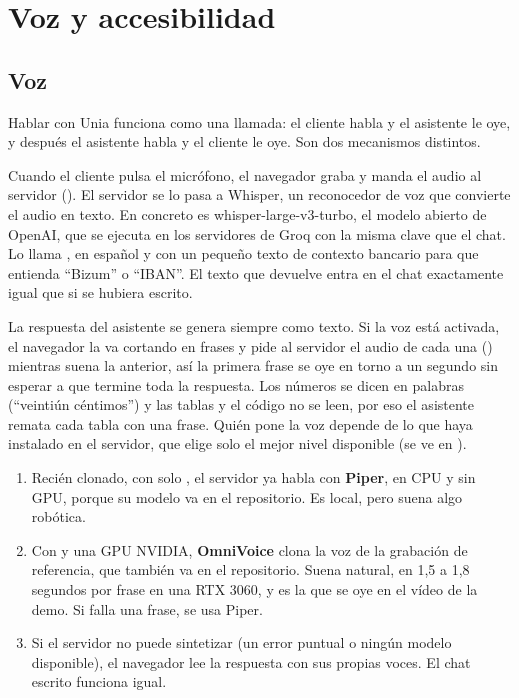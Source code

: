 \section{Voz y accesibilidad}\label{sec:voz}

\subsection{Voz}\label{sec:voz-detalle}

Hablar con Unia funciona como una llamada: el cliente habla y el asistente le oye, y después el asistente habla y el
cliente le oye. Son dos mecanismos distintos.

Cuando el cliente pulsa el micrófono, el navegador graba y manda el audio al servidor (). El servidor se lo
pasa a Whisper, un reconocedor de voz que convierte el audio en texto. En concreto es whisper-large-v3-turbo, el modelo
abierto de OpenAI, que se ejecuta en los servidores de Groq con la misma clave que el chat. Lo llama
, en español y con un pequeño texto de contexto bancario para que
entienda ``Bizum'' o ``IBAN''. El texto que devuelve entra en el chat exactamente igual que si se hubiera escrito.

La respuesta del asistente se genera siempre como texto. Si la voz está activada, el navegador la va cortando en frases y
pide al servidor el audio de cada una () mientras suena la anterior, así la primera frase se oye en torno
a un segundo sin esperar a que termine toda la respuesta. Los números se dicen en palabras (``veintiún céntimos'') y las
tablas y el código no se leen, por eso el asistente remata cada tabla con una frase. Quién pone la voz depende de lo que
haya instalado en el servidor, que elige solo el mejor nivel disponible (se ve en ).

\begin{enumerate}
  \item Recién clonado, con solo , el servidor ya habla con \textbf{Piper}, en CPU y sin GPU,
  porque su modelo va en el repositorio. Es local, pero suena algo robótica.
  \item Con  y una GPU NVIDIA, \textbf{OmniVoice} clona la voz de la grabación de
  referencia, que también va en el repositorio. Suena natural, en 1,5 a 1,8 segundos por frase en una RTX 3060, y es la
  que se oye en el vídeo de la demo. Si falla una frase, se usa Piper.
  \item Si el servidor no puede sintetizar (un error puntual o ningún modelo disponible), el navegador lee la respuesta
  con sus propias voces. El chat escrito funciona igual.
\end{enumerate}

